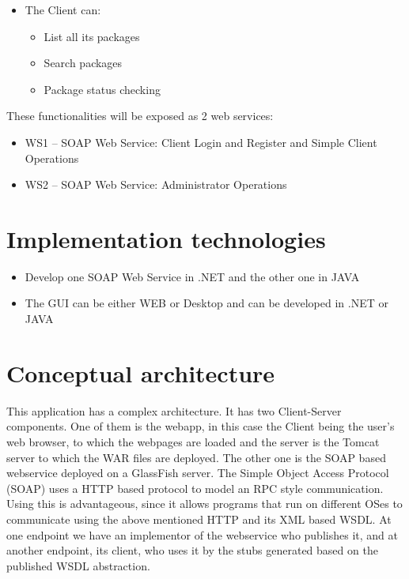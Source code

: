 \documentclass[a4paper,10pt]{report}
\begin{document}
\begin{itemize}
    \item The Client can:
    \begin{itemize}
        \item List all its packages
        \item Search packages
        \item Package status checking
    \end{itemize}
\end{itemize}

These functionalities will be exposed as 2 web services:
\begin{itemize}
    \item WS1 – SOAP Web Service: Client Login and Register and Simple Client Operations
    \item WS2 – SOAP Web Service: Administrator Operations
\end{itemize}

\section{Implementation technologies}
\begin{itemize}
    \item Develop one SOAP Web Service in .NET and the other one in JAVA
    \item The GUI can be either WEB or Desktop and can be developed in .NET or JAVA
\end{itemize}

\section{Conceptual architecture}
This application has a complex architecture. It has two Client-Server components. One of them is the webapp, in this case the Client being the user's web browser, to which the webpages are loaded and the server is the Tomcat server to which the WAR files are deployed. The other one is the SOAP based webservice deployed on a GlassFish server.
The Simple Object Access Protocol (SOAP) uses a HTTP based protocol to model an RPC style communication. Using this is advantageous, since it allows programs that run on different OSes to communicate using the above mentioned HTTP and its XML based WSDL. At one endpoint we have an implementor of the webservice who publishes it, and at another endpoint, its client, who uses it by the stubs generated based on the published WSDL abstraction.
\end{document}
